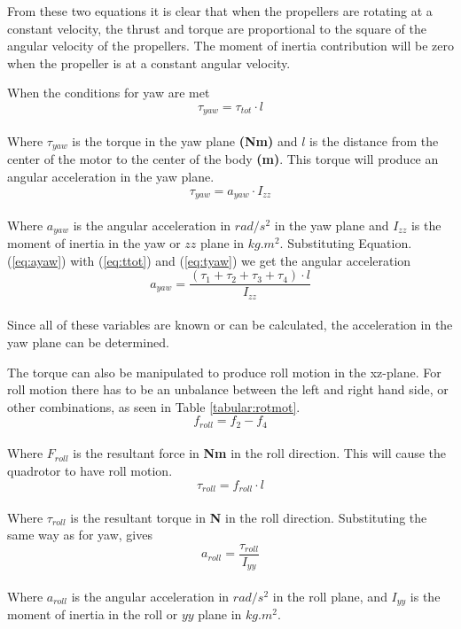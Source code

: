 From these two equations it is clear that when the propellers are rotating at a constant velocity, the thrust and torque are proportional to the square of the angular velocity of the propellers. The moment of inertia contribution will be zero when the propeller is at a constant angular velocity.\bigskip 

When the conditions for yaw are met
\begin{equation}
    \label{eq:tyaw}
    \tau_{yaw} = \tau_{tot}\cdot l
\end{equation}
\\
Where $\tau_{yaw}$ is the torque in the yaw plane \textbf{(Nm) }and $l$ is the distance from the center of the motor to the center of the body \textbf{(m)}. This torque will produce an angular acceleration in the yaw plane. 
\begin{equation}
    \label{eq:ayaw}
    \tau_{yaw} = a_{yaw}\cdot I_{zz}
\end{equation}
\\
Where $a_{yaw}$ is the angular acceleration in $rad/s^2$ in the yaw plane and $I_{zz}$ is the moment of inertia in the yaw or $zz$ plane in $kg.m^2$. Substituting Equation. (\ref{eq:ayaw}) with (\ref{eq:ttot}) and (\ref{eq:tyaw}) we get the angular acceleration
\begin{equation}
    a_{yaw} = \frac{(\tau_1 + \tau_2 + \tau_3 + \tau_4) \cdot l}{I_{zz}}
\end{equation}
\\ 
Since all of these variables are known or can be calculated, the acceleration in the yaw plane can be determined. \bigskip

The torque can also be manipulated to produce roll motion in the xz-plane. For roll motion there has to be an unbalance between the left and right hand side, or other combinations, as seen in Table \ref{tabular:rotmot}. 
\begin{equation}
f_{roll} = f_2 - f_4
\end{equation}
\\
Where $F_{roll}$ is the resultant force in \textbf{Nm} in the roll direction. This will cause the quadrotor to have roll motion. 
\begin{equation}
\tau_{roll} = f_{roll}\cdot l
\end{equation}
\\
Where $\tau_{roll}$ is the resultant torque in \textbf{N} in the roll direction. Substituting the same way as for yaw, gives
\begin{equation}
    \label{eq:aroll}
    a_{roll} = \frac{\tau_{roll}}{I_{yy}}
\end{equation}
\\
Where $a_{roll}$ is the angular acceleration in $rad/s^2$ in the roll plane, and $I_{yy}$ is the moment of inertia in the roll or $yy$ plane in $kg.m^2$. \bigskip

